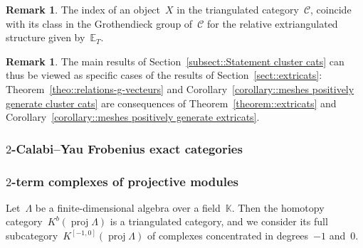 \documentclass{amsart}
\theoremstyle{definition}
\newtheorem{remark}[theorem]{Remark}
\newcommand{\field}{\mathbb{K}}
\newcommand{\cat}{\mathcal{C}}
\newcommand{\proj}{\operatorname{proj}}
\begin{document}
\begin{remark}
The index of an object~$X$ in the triangulated category~$\cat$, coincide with its class in the Grothendieck group of~$\cat$ for the relative extriangulated structure given by~$\mathbb{E}_T$.
\end{remark}

\begin{remark}
 The main results of Section~\ref{subsect::Statement cluster cats} can thus be viewed as specific cases of the results of Section~\ref{sect::extricats}: Theorem~\ref{theo::relations-g-vecteurs} and Corollary~\ref{corollary::meshes positively generate cluster cats} are consequences of Theorem~\ref{theorem::extricats} and Corollary~\ref{corollary::meshes positively generate extricats}.
\end{remark}



\subsubsection{$2$-Calabi--Yau Frobenius exact categories}\label{sect::2CYexact}

\subsubsection{$2$-term complexes of projective modules}\label{sect::Kbproj}
Let~$\Lambda$ be a finite-dimensional algebra over a field~$\field$.  Then the homotopy category~$K^b(\proj \Lambda)$ is a triangulated category, and we consider its full subcategory~$K^{[-1,0]}(\proj \Lambda)$ of complexes concentrated in degrees~$-1$ and~$0$.
\end{document}

